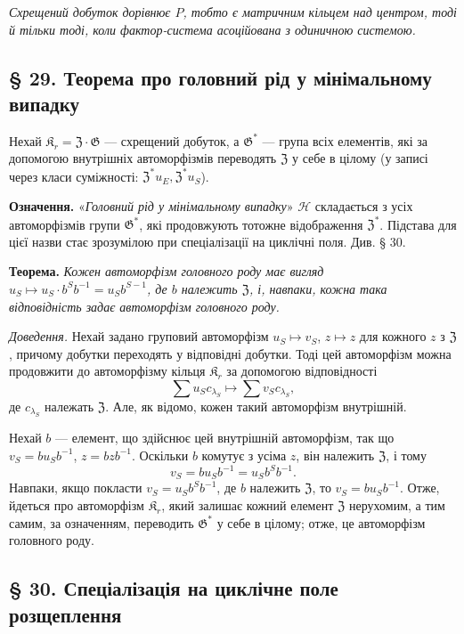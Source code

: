 \documentclass[11pt]{article}
\begin{document}
\noindent\emph{Схрещений добуток дорівнює \(P\), тобто є матричним кільцем над центром, тоді й тільки тоді, коли фактор-система асоційована з одиничною системою.}

\subsection*{§ 29. Теорема про головний рід у мінімальному випадку}\label{hauptgeschlechtssatz-im-minimalen}

Нехай \(\mathfrak K_r=\mathfrak Z\cdot\mathfrak G\) --- схрещений добуток, а \(\mathfrak G^*\) --- група всіх елементів, які за допомогою внутрішніх автоморфізмів переводять \(\mathfrak Z\) у себе в цілому (у записі через класи суміжності: \(\mathfrak Z^*u_E,\mathfrak Z^*u_S\)).

\noindent\textbf{Означення.} «\emph{Головний рід у мінімальному випадку}» \(\mathscr H\) складається з усіх автоморфізмів групи \(\mathfrak G^*\), які продовжують тотожне відображення \(\mathfrak Z^*\). Підстава для цієї назви стає зрозумілою при спеціалізації на циклічні поля. Див. § 30.

\noindent\textbf{Теорема.} \emph{Кожен автоморфізм головного роду має вигляд \(u_S\mapsto u_S\cdot b^Sb^{-1}=u_Sb^{S-1}\), де \(b\) належить \(\mathfrak Z\), і, навпаки, кожна така відповідність задає автоморфізм головного роду.}

\noindent\emph{Доведення.} Нехай задано груповий автоморфізм \(u_S\mapsto v_S\), \(z\mapsto z\) для кожного \(z\) з \(\mathfrak Z\), причому добутки переходять у відповідні добутки. Тоді цей автоморфізм можна продовжити до автоморфізму кільця \(\mathfrak K_r\) за допомогою відповідності
\[
\sum u_Sc_{\lambda_S}\mapsto\sum v_Sc_{\lambda_S},
\]
де \(c_{\lambda_S}\) належать \(\mathfrak Z\). Але, як відомо, кожен такий автоморфізм внутрішній.

Нехай \(b\) --- елемент, що здійснює цей внутрішній автоморфізм, так що \(v_S=bu_Sb^{-1}\), \(z=bzb^{-1}\). Оскільки \(b\) комутує з усіма \(z\), він належить \(\mathfrak Z\), і тому
\[
v_S=bu_Sb^{-1}=u_Sb^Sb^{-1}.
\]
Навпаки, якщо покласти \(v_S=u_Sb^Sb^{-1}\), де \(b\) належить \(\mathfrak Z\), то \(v_S=bu_Sb^{-1}\). Отже, йдеться про автоморфізм \(\mathfrak K_r\), який залишає кожний елемент \(\mathfrak Z\) нерухомим, а тим самим, за означенням, переводить \(\mathfrak G^*\) у себе в цілому; отже, це автоморфізм головного роду.

\subsection*{§ 30. Спеціалізація на циклічне поле розщеплення}\label{spezialisierung-auf-zyklische-zerfaellungskoerper}
\end{document}
